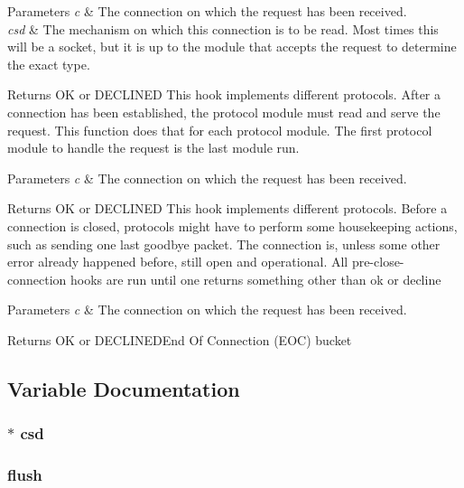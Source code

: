 \begin{DoxyParams}{Parameters}
{\em c} & The connection on which the request has been received. \\
\hline
{\em csd} & The mechanism on which this connection is to be read. Most times this will be a socket, but it is up to the module that accepts the request to determine the exact type. \\
\hline
\end{DoxyParams}
\begin{DoxyReturn}{Returns}
OK or D\+E\+C\+L\+I\+N\+ED This hook implements different protocols. After a connection has been established, the protocol module must read and serve the request. This function does that for each protocol module. The first protocol module to handle the request is the last module run. 
\end{DoxyReturn}

\begin{DoxyParams}{Parameters}
{\em c} & The connection on which the request has been received. \\
\hline
\end{DoxyParams}
\begin{DoxyReturn}{Returns}
OK or D\+E\+C\+L\+I\+N\+ED This hook implements different protocols. Before a connection is closed, protocols might have to perform some housekeeping actions, such as sending one last goodbye packet. The connection is, unless some other error already happened before, still open and operational. All pre-\/close-\/connection hooks are run until one returns something other than ok or decline 
\end{DoxyReturn}

\begin{DoxyParams}{Parameters}
{\em c} & The connection on which the request has been received. \\
\hline
\end{DoxyParams}
\begin{DoxyReturn}{Returns}
OK or D\+E\+C\+L\+I\+N\+E\+D\+End Of Connection (E\+OC) bucket 
\end{DoxyReturn}


\subsection{Variable Documentation}
\subsubsection[{\texorpdfstring{csd}{csd}}]{$\ast$ csd}\hypertarget{group__APACHE__CORE__CONNECTION_ga37491385bd0907d7a64ed8a3ec309aaa}{}\label{group__APACHE__CORE__CONNECTION_ga37491385bd0907d7a64ed8a3ec309aaa}
\subsubsection[{\texorpdfstring{flush}{flush}}]{ flush}\hypertarget{group__APACHE__CORE__CONNECTION_ga0e45940edc0a96a29eea9b91650341ae}{}\label{group__APACHE__CORE__CONNECTION_ga0e45940edc0a96a29eea9b91650341ae}
